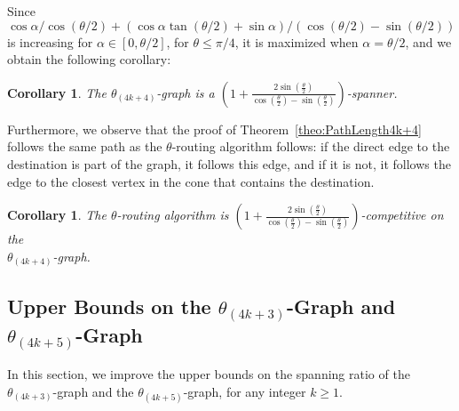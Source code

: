 \documentclass[12pt]{article}
\newtheorem{coro}[defin]{Corollary}
\newenvironment{corollary}{\begin{coro} \sl}{\end{coro}}
\newcommand{\Graph}[1]{\ensuremath{\theta_{(4 k + #1)}}-Graph\xspace}
\newcommand{\graph}[1]{\ensuremath{\theta_{(4 k + #1)}}-graph\xspace}
\begin{document}
Since $\cos \alpha / \cos (\theta/2) + (\cos \alpha \tan (\theta/2) + \sin \alpha) / (\cos (\theta/2) - \sin (\theta/2))$ is increasing for $\alpha \in [0, \theta/2]$, for $\theta \leq \pi/4$, it is maximized when $\alpha = \theta/2$, and we obtain the following corollary: 

\begin{corollary}
  \label{cor:SpanningRatio4k+4}
  The \graph{4} is a $\left( 1 + \frac{2 \sin \left( \frac{\theta}{2} \right)}{\cos \left( \frac{\theta}{2} \right) - \sin \left( \frac{\theta}{2} \right)} \right)$-spanner. 
\end{corollary}

Furthermore, we observe that the proof of Theorem~\ref{theo:PathLength4k+4} follows the same path as the $\theta$-routing algorithm follows: if the direct edge to the destination is part of the graph, it follows this edge, and if it is not, it follows the edge to the closest vertex in the cone that contains the destination. 

\begin{corollary}
  \label{cor:Routing4k+4}
  The $\theta$-routing algorithm is $\left( 1 + \frac{2 \sin \left( \frac{\theta}{2} \right)}{\cos \left( \frac{\theta}{2} \right) - \sin \left( \frac{\theta}{2} \right)} \right)$-competitive on the \\ \graph{4}. 
\end{corollary}


\subsection{Upper Bounds on the \Graph{3} and \Graph{5}}
\label{subsec:Theta4k+35}
In this section, we improve the upper bounds on the spanning ratio of the \graph{3} and the \graph{5}, for any integer $k \geq 1$. 
\end{document}
